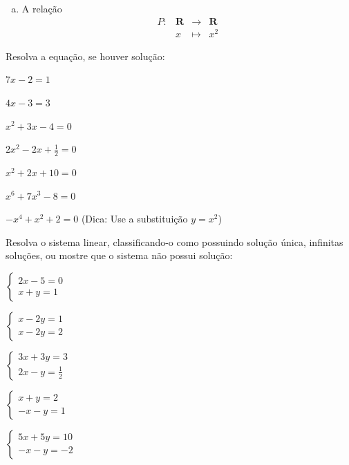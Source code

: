 \begin{secaoexercicio}
\begin{xca}
\begin{enumerate}[(a)]
\item A relação
$$\begin{array}{crcl}
P:&\mathbf{R}&\rightarrow& \mathbf{R} \\
&x&\mapsto& x^2\end{array}$$
\end{enumerate}

\end{xca}

\begin{xca}  Resolva a equação, se houver solução:
\begin{colexercicio}{3}
\item $7x-2=1$
\item $4x-3=3$
\item $x^2+3x-4=0$
\item $2x^2-2x+\frac{1}{2}=0$
\item $x^2+2x+10=0$
\item $x^6+7x^3-8=0$
\item $-x^4+x^2+2=0$ (Dica: Use a substituição $y=x^2$)
\end{colexercicio}
\end{xca}

\begin{xca} Resolva o sistema linear, classificando-o como possuindo solução única, infinitas soluções,
 ou mostre que o sistema não possui solução:
\begin{colexercicio}{3}
\item
$\left\{\begin{array}{c}
2x-5=0\\
x+y=1
\end{array}\right.$
\item
$\left\{\begin{array}{c}
x-2y=1\\
x-2y=2
\end{array}\right.$
\item
$\left\{\begin{array}{c}
3x+3y=3\\
2x-y=\frac{1}{2}
\end{array}\right.$
\item
$\left\{\begin{array}{c}
x+y=2\\
-x-y=1
\end{array}\right.$
\item
$\left\{\begin{array}{c}
5x+5y=10\\
-x-y=-2
\end{array}\right.$
\end{colexercicio}
\end{xca}
\end{secaoexercicio}
